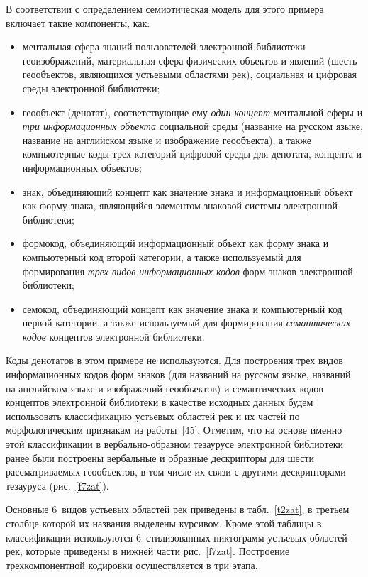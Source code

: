 \begin{multicols}{2}
   В соответствии с определением семиотическая модель для этого примера включает  такие 
компоненты, как:
   \begin{itemize}
\item ментальная сфера знаний пользователей электронной библиотеки 
геоизображений, материальная сфера физических объектов и явлений (шесть 
геообъектов, являющихся устьевыми областями рек), социальная и цифровая 
среды электронной библиотеки;
\item геообъект (денотат), соответствующие ему \textit{один концепт} ментальной 
сферы и \textit{три информационных объекта} социальной среды (название на 
русском языке, название на английском языке и изображение геообъекта), а также 
компьютерные коды трех категорий цифровой среды для денотата, концепта и 
информационных объектов;
\item знак, объединяющий концепт как значение знака и информационный объект 
как форму знака, являющийся элементом знаковой системы электронной 
библиотеки;
\item формокод, объединяющий информационный объект как форму знака и 
компьютерный код второй категории, а также используемый для формирования 
\textit{трех видов информационных кодов} форм знаков электронной библиотеки;
\item семокод, объединяющий концепт как значение знака и компьютерный код 
первой категории, а также используемый для формирования \textit{семантических 
кодов} концептов электронной биб\-лио\-те\-ки.
\end{itemize}
   
   Коды денотатов в этом примере не используются. Для построения трех видов 
информационных кодов форм знаков (для названий на русском языке, названий на 
английском языке и изображений геообъектов) и семантических кодов концептов 
электронной библиотеки в качестве исходных данных будем использовать классификацию 
усть\-евых областей рек и их частей по морфологическим признакам из 
работы~[45]. Отметим, что на основе именно этой классификации в 
   вербально-образном тезаурусе электронной библиотеки ранее были построены 
вербальные и образные дескрипторы для шести рассматриваемых геообъектов, в том числе 
их связи с другими дескрипторами тезауруса (рис.~\ref{f7zat}).
   
   Основные 6~видов устьевых областей рек приведены в табл.~\ref{t2zat}, в третьем 
столбце которой их названия выделены курсивом. Кроме этой таблицы в классификации 
используются 6~стилизованных пиктограмм устьевых областей рек, которые приведены в 
нижней части рис.~\ref{f7zat}. Построение трехкомпонентной кодировки осуществляется в 
три этапа.
   

\end{multicols}
